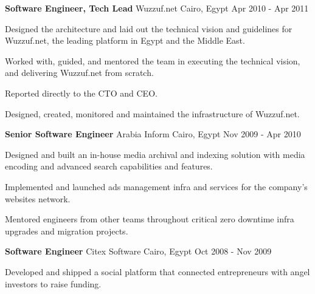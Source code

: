 \begin{cventries}
	\cventry
	{\textbf{Software Engineer, Tech Lead}} %
	{Wuzzuf.net} %
	{Cairo, Egypt} %
	{Apr 2010 - Apr 2011} %
	{
		\begin{cvitems} %
			\item {
			            Designed the architecture and laid out the technical vision and
			            guidelines for Wuzzuf.net, the leading platform in Egypt and the Middle
			            East.
			      }
			\item {
			            Worked with, guided, and mentored the team in executing the technical
			            vision, and delivering Wuzzuf.net from scratch.
			      }
			\item {
			            Reported directly to the CTO and CEO.
			      }
			\item {
			            Designed, created, monitored and maintained the infrastructure of
			            Wuzzuf.net.
			      }
		\end{cvitems}
	}

	\cventry
	{\textbf{Senior Software Engineer}} %
	{Arabia Inform} %
	{Cairo, Egypt} %
	{Nov 2009 - Apr 2010} %
	{
		\begin{cvitems} %
			\item {
			            Designed and built an in-house media archival and indexing solution
			            with media encoding and advanced search capabilities and features.
			      }
			\item {
			            Implemented and launched ads management infra and services for the
			            company’s websites network.
			      }
			\item {
			            Mentored engineers from other teams throughout critical zero downtime
			            infra upgrades and migration projects.
			      }
		\end{cvitems}
	}

	\cventry
	{\textbf{Software Engineer}} %
	{Citex Software} %
	{Cairo, Egypt} %
	{Oct 2008 - Nov 2009} %
	{
		\begin{cvitems} %
			\item {
			            Developed and shipped a social platform that connected entrepreneurs
			            with angel investors to raise funding.
			      }
		\end{cvitems}
	}


\end{cventries}
